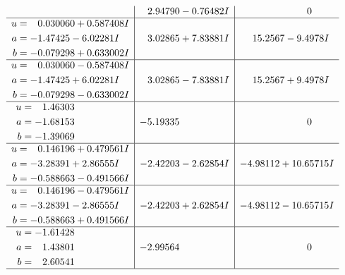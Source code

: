 \documentclass[1p]{elsarticle_modified}
\theoremstyle{definition}
\begin{document}
$$\begin{array}{c|c|c}
 & \phantom{-}2.94790 - 0.76482 I & \phantom{-0.000000 } 0 \\ \hline\begin{aligned}
u &= \phantom{-}0.030060 + 0.587408 I \\
a &= -1.47425 - 6.02281 I \\
b &= -0.079298 + 0.633002 I\end{aligned}
 & \phantom{-}3.02865 + 7.83881 I & \phantom{-}15.2567 - 9.4978 I \\ \hline\begin{aligned}
u &= \phantom{-}0.030060 - 0.587408 I \\
a &= -1.47425 + 6.02281 I \\
b &= -0.079298 - 0.633002 I\end{aligned}
 & \phantom{-}3.02865 - 7.83881 I & \phantom{-}15.2567 + 9.4978 I \\ \hline\begin{aligned}
u &= \phantom{-}1.46303\phantom{ +0.000000I} \\
a &= -1.68153\phantom{ +0.000000I} \\
b &= -1.39069\phantom{ +0.000000I}\end{aligned}
 & -5.19335\phantom{ +0.000000I} & \phantom{-0.000000 } 0 \\ \hline\begin{aligned}
u &= \phantom{-}0.146196 + 0.479561 I \\
a &= -3.28391 + 2.86555 I \\
b &= -0.588663 - 0.491566 I\end{aligned}
 & -2.42203 - 2.62854 I & -4.98112 + 10.65715 I \\ \hline\begin{aligned}
u &= \phantom{-}0.146196 - 0.479561 I \\
a &= -3.28391 - 2.86555 I \\
b &= -0.588663 + 0.491566 I\end{aligned}
 & -2.42203 + 2.62854 I & -4.98112 - 10.65715 I \\ \hline\begin{aligned}
u &= -1.61428\phantom{ +0.000000I} \\
a &= \phantom{-}1.43801\phantom{ +0.000000I} \\
b &= \phantom{-}2.60541\phantom{ +0.000000I}\end{aligned}
 & -2.99564\phantom{ +0.000000I} & \phantom{-0.000000 } 0\\
 \hline 
 \end{array}$$\newpage$$\begin{array}{c|c|c}  

\end{array}$$
\end{document}
